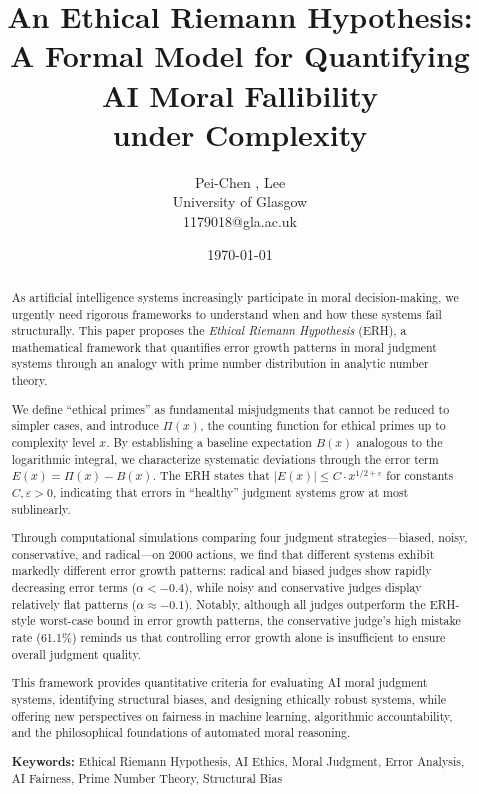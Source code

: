 \documentclass[12pt,a4paper]{article}
\title{An Ethical Riemann Hypothesis:\\
       A Formal Model for Quantifying AI Moral Fallibility\\
       under Complexity}
\author{Pei-Chen , Lee \\
        University of Glasgow \\
        1179018@gla.ac.uk}
\date{\today}
\theoremstyle{definition}
\theoremstyle{remark}
\begin{document}
\maketitle

\begin{abstract}
As artificial intelligence systems increasingly participate in moral decision-making, we urgently need rigorous frameworks to understand when and how these systems fail structurally. This paper proposes the \emph{Ethical Riemann Hypothesis} (ERH), a mathematical framework that quantifies error growth patterns in moral judgment systems through an analogy with prime number distribution in analytic number theory.

We define ``ethical primes'' as fundamental misjudgments that cannot be reduced to simpler cases, and introduce $\Pi(x)$, the counting function for ethical primes up to complexity level $x$. By establishing a baseline expectation $B(x)$ analogous to the logarithmic integral, we characterize systematic deviations through the error term $E(x) = \Pi(x) - B(x)$. The ERH states that $|E(x)| \leq C \cdot x^{1/2 + \varepsilon}$ for constants $C, \varepsilon > 0$, indicating that errors in ``healthy'' judgment systems grow at most sublinearly.

Through computational simulations comparing four judgment strategies---biased, noisy, conservative, and radical---on 2000 actions, we find that different systems exhibit markedly different error growth patterns: radical and biased judges show rapidly decreasing error terms ($\alpha < -0.4$), while noisy and conservative judges display relatively flat patterns ($\alpha \approx -0.1$). Notably, although all judges outperform the ERH-style worst-case bound in error growth patterns, the conservative judge's high mistake rate (61.1\%) reminds us that controlling error growth alone is insufficient to ensure overall judgment quality.

This framework provides quantitative criteria for evaluating AI moral judgment systems, identifying structural biases, and designing ethically robust systems, while offering new perspectives on fairness in machine learning, algorithmic accountability, and the philosophical foundations of automated moral reasoning.

\textbf{Keywords:} Ethical Riemann Hypothesis, AI Ethics, Moral Judgment, Error Analysis, AI Fairness, Prime Number Theory, Structural Bias
\end{abstract}

\end{document}

